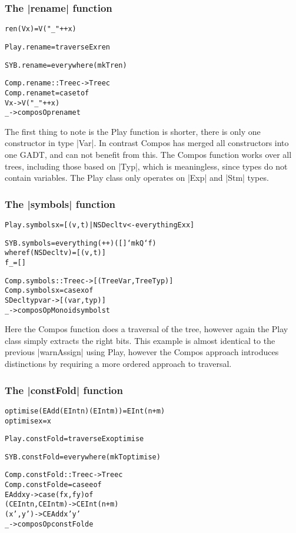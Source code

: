 \documentclass[preprint]{sigplanconf}
\newenvironment{code}{\begin{alltt}\small}{\end{alltt}}
\begin{document}
\subsubsection{The |rename| function}

\begin{code} %
ren (V x) = V ("_" ++ x)

Play.rename = traverseEx ren

SYB.rename = everywhere (mkT ren)

Comp.rename :: Tree c -> Tree c
Comp.rename t = case t of
    V x -> V ("_" ++ x)
    _   -> composOp rename t
\end{code}

The first thing to note is the Play function is shorter, there is only one constructor in type |Var|. In contrast Compos has merged all constructors into one GADT, and can not benefit from this. The Compos function works over all trees, including those based on |Typ|, which is meaningless, since types do not contain variables. The Play class only operates on |Exp| and |Stm| types.


\subsubsection{The |symbols| function}

\begin{code}
Play.symbols x = [(v,t) | NSDecl t v <- everythingEx x]

SYB.symbols = everything (++) ([] `mkQ` f)
    where  f (NSDecl t v)  = [(v,t)]
           f _             = []

Comp.symbols :: Tree c -> [(Tree Var, Tree Typ)]
Comp.symbols x = case x of
    SDecl typ var -> [(var,typ)]
    _ -> composOpMonoid symbols t
\end{code}

Here the Compos function does a traversal of the tree, however again the Play class simply extracts the right bits. This example is almost identical to the previous |warnAssign| using Play, however the Compos approach introduces distinctions by requiring a more ordered approach to traversal.


\subsubsection{The |constFold| function}

\begin{code}
optimise (EAdd (EInt n) (EInt m)) = EInt (n+m)
optimise x = x

Play.constFold = traverseEx optimise

SYB.constFold = everywhere (mkT optimise)

Comp.constFold :: Tree c -> Tree c
Comp.constFold e = case e of
    EAdd x y -> case  (f x, f y) of
                      (CEInt n, CEInt m) -> CEInt (n+m)
                      (x',y') -> CEAdd x' y'
    _ -> composOp constFold e
\end{code}
\end{document}
